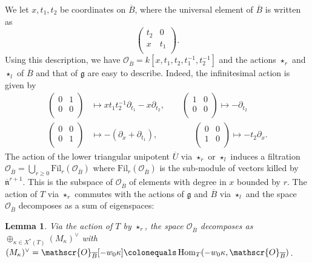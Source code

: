 \documentclass[10pt, oneside]{amsart}
\newcommand{\defeq}{\colonequals}
\numberwithin{equation}{subsection}
\newtheorem{lemma}[equation]{Lemma}
\theoremstyle{definition}
\theoremstyle{remark}
\newcommand{\opn}[1]{\operatorname{#1}}
\def\oscr{\mathscr{O}}
\begin{document}
We let $x, t_1, t_2$ be coordinates on $\overline{B}$, where the universal element of $\overline{B}$ is written as 
$$\begin{pmatrix} 
         t_2 & 0 \\
         x & t_1 \\
      \end{pmatrix}.$$
Using this description, we have $\oscr_{\overline{B}} = k[x, t_1, t_2, t_1^{-1}, t_2^{-1}]$ and the actions $\star_r$ and $\star_l$ of $\overline{B}$ and that of $\mathfrak{g}$ are easy to describe. Indeed, the infinitesimal action is given by
\begin{align*}
    \begin{pmatrix}
            0 & 1 \\
            0 & 0 \\
   \end{pmatrix} &\mapsto x t_1 t_2^{-1} \partial_{t_1} - x \partial_{t_2}, \quad \quad \begin{pmatrix}
            1 & 0 \\
            0 & 0 \\
   \end{pmatrix} \mapsto -\partial_{t_2} \\
   \begin{pmatrix}
            0 & 0 \\
            0 & 1 \\
   \end{pmatrix} &\mapsto -(\partial_x +\partial_{t_1}), \quad \quad \; \quad \quad \begin{pmatrix}
            0 & 0 \\
            1 & 0 \\
   \end{pmatrix} \mapsto -t_2 \partial_{x} .
\end{align*}
The action of the lower triangular unipotent $\overline{U}$ via $\star_r$ or $\star_l$ induces a filtration $\oscr_{\overline{B}} = \bigcup_{r \geq 0} \mathrm{Fil}_r(\oscr_{\overline{B}})$ where $\mathrm{Fil}_r(\oscr_{\overline{B}})$ is the sub-module of vectors killed by $\overline{\mathfrak{n}}^{r+1}$. This is the subspace of $\oscr_{\overline{B}}$ of elements with degree in $x$ bounded by $r$. The action of $T$ via $\star_r$ commutes with the actions of $\mathfrak{g}$ and $\overline{B}$ via $\star_l$ and the space   $\oscr_{\overline{B}}$ decomposes as a sum of eigenspaces: 

\begin{lemma}\label{lem-Brep}  
Via the action of $T$ by $\star_r$, the space $\oscr_{\overline{B}}$ decomposes as $\oplus_{\kappa \in X^*(T)} (M_{\kappa})^\vee$ with $(M_{\kappa})^\vee = \mathscr{O}_{\overline{B}}[-w_0\kappa] \defeq \opn{Hom}_T(-w_0\kappa, \mathscr{O}_{\overline{B}})$. 
\end{lemma}
\end{document}
